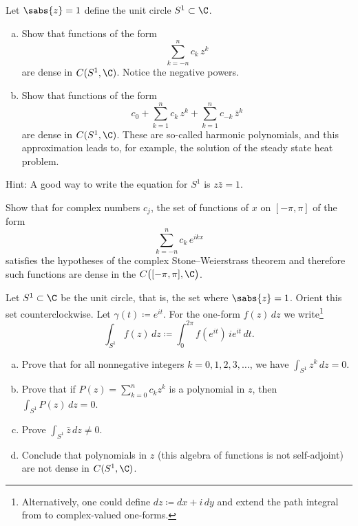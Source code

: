 \begin{exercise}
\pagebreak[3]
Let $\sabs{z}=1$ define the unit circle $S^1 \subset \C$.
\begin{enumerate}[a)]
\item
Show that functions of the form
\begin{equation*}
\sum_{k=-n}^n c_k\, z^k
\end{equation*}
are dense in $C(S^1,\C)$.  Notice the negative powers.
\item 
Show that functions of the form
\begin{equation*}
c_0
+
\sum_{k=1}^n c_k \, z^k
+
\sum_{k=1}^n c_{-k}\, \bar{z}^k
\end{equation*}
are dense in $C(S^1,\C)$.  These are so-called harmonic polynomials,
and this approximation leads to, for example, the solution of the
steady state heat problem.
\end{enumerate}
Hint: A good way to write the equation for $S^1$ is $z \bar{z} = 1$.
\end{exercise}

\begin{exercise}
Show that for complex numbers $c_j$, the set of functions
of $x$ on $[-\pi,\pi]$
of the form
\begin{equation*}
\sum_{k=-n}^n c_k \, e^{ik x}
\end{equation*}
satisfies the hypotheses of the complex Stone--Weierstrass theorem
and therefore such functions are dense in the $C\bigl([-\pi,\pi],\C\bigr)$.
\end{exercise}

\begin{exercise} \label{exercise:selfadjointSW}
Let $S^1 \subset \C$ be the unit circle, that is, the set where
$\sabs{z} = 1$.  Orient this set counterclockwise.
Let $\gamma(t) \coloneqq e^{it}$.
For the one-form $f(z)\,dz$ we write\footnote{%
Alternatively, one could define $dz \coloneqq dx + i \, dy$ and
extend the path integral from  to complex-valued
one-forms.}
\begin{equation*}
\int_{S^1} f(z) \,dz \coloneqq \int_0^{2\pi} f(e^{it}) \, i e^{it} \, dt . 
\end{equation*}
\begin{enumerate}[a)]
\item
Prove that for all nonnegative integers $k = 0,1,2,3,\ldots$, we have
$\int_{S^1} z^k \, dz = 0$.
\item
Prove that if
$P(z) = \sum_{k=0}^n c_k z^k$ is a
polynomial in $z$, then
$\int_{S^1} P(z) \, dz = 0$.
\item
Prove
$\int_{S^1} \bar{z} \, dz \not= 0$.
\item
Conclude that polynomials in $z$ (this algebra of functions is
not self-adjoint) are not dense in $C(S^1,\C)$.
\end{enumerate}
\end{exercise}

